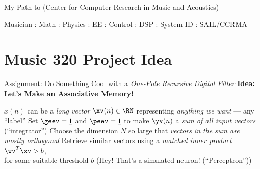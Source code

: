\begin{slide}[\slideopts,toc={Path to CCRMA}]{My Path to
    (Center for Computer Research in Music and Acoustics)
}

\centerline{Musician : Math : Physics : EE : Control : DSP : System ID : SAIL/CCRMA}
\vspace{1em}

\end{slide}



%

\section[\sectopts,toc={Basic Idea}]{Music 320 Project Idea}

\begin{slide}[\slideopts,toc={One Pole Filter}]{Assignment: Do Something Cool with a \emph{One-Pole Recursive Digital Filter}}
\vspace{-1em}
\maybepause
\vspace{-1em}
\textbf{Idea: Let's Make an Associative Memory!}
\begin{itemize}
\mpitem $x(n)$ can be a \emph{long vector} $\xv(n)\in\RN$ representing \emph{anything we want} --- any ``label''
\mpitem Set $\geev = \onevec$ and $\peev = \onevec$ to make $\yv(n)$ a \emph{sum of all input vectors} (``integrator'')
\mpitem Choose the dimension $N$ so large that \emph{vectors in the sum are mostly orthogonal}
\mpitem Retrieve similar vectors using a \emph{matched inner product} $\wv^T\xv > b$,\\
        for some suitable threshold $b$ (Hey! That's a simulated neuron! (``Perceptron''))
\end{itemize}
\end{slide}

